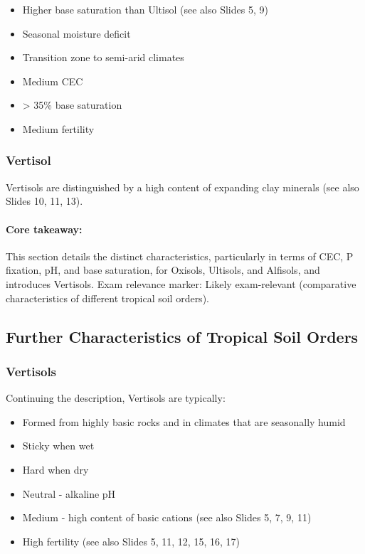 \begin{itemize} 
    \item Higher base saturation than Ultisol (see also Slides 5, 9) 
    \item Seasonal moisture deficit 
    \item Transition zone to semi-arid climates 
    \item Medium CEC 
    \item > 35\% base saturation 
    \item Medium fertility 
\end{itemize}

\subsubsection*{Vertisol} Vertisols are distinguished by a high content of expanding clay minerals (see also Slides 10, 11, 13).

\paragraph*{Core takeaway:} 
This section details the distinct characteristics, particularly in terms of CEC, P fixation, pH, and base saturation, for Oxisols, Ultisols, and Alfisols, and introduces Vertisols. Exam relevance marker: Likely exam-relevant (comparative characteristics of different tropical soil orders).

\subsection{Further Characteristics of Tropical Soil Orders} \subsubsection*{Vertisols} Continuing the description, Vertisols are typically: 

\begin{itemize} 
    \item Formed from highly basic rocks and in climates that are seasonally humid 
    \item Sticky when wet 
    \item Hard when dry 
    \item Neutral - alkaline pH 
    \item Medium - high content of basic cations (see also Slides 5, 7, 9, 11) 
    \item High fertility (see also Slides 5, 11, 12, 15, 16, 17) 
\end{itemize}


